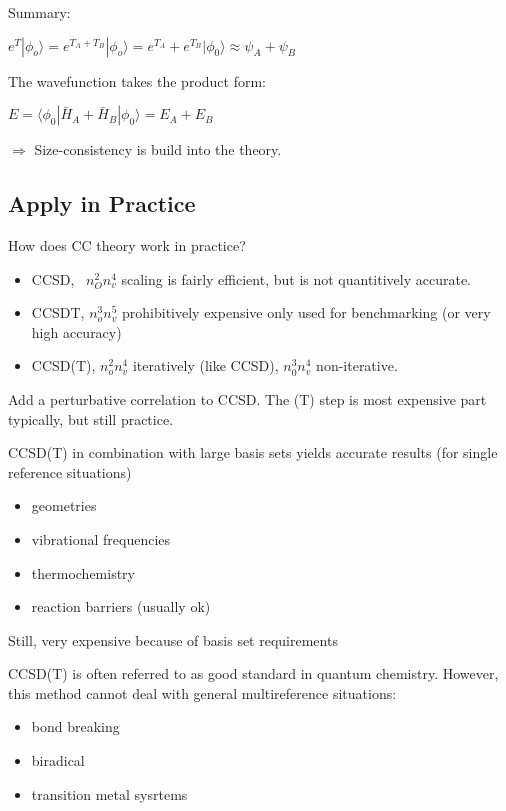 \documentclass[a4paper, 12pt]{article}
\begin{document}
\tab Summary:
\begin{center}
$e^T|\phi_o\rangle = e^{T_A+T_B}|\phi_o\rangle= e^{T_A} +e^{T_B}|\phi_0\rangle \approx \psi_A+\psi_B  $	
\end{center} 
The wavefunction takes the product form:
\begin{center}
$E=\langle \phi_0|\bar{H}_A+\bar{H}_B|\phi_0\rangle =E_A+E_B $	
\end{center} 
$\Rightarrow$ Size-consistency is build into the theory.\\

\subsection{Apply in Practice}
How does CC theory work in practice? 
\begin{itemize}
	\item CCSD, \ $n_O^2 n_v^4$ scaling is fairly efficient, but is not quantitively accurate.
	\item CCSDT, $n_o^3n_v^5$ prohibitively expensive only used for benchmarking (or very high accuracy)
	\item CCSD(T), $n_o^2n_v^4$ iteratively (like CCSD), $n_0^3n_v^4$ non-iterative.
\end{itemize}
\tab Add a perturbative correlation to CCSD. The (T) step is most expensive part typically, but still practice.

CCSD(T) in combination with large basis sets yields accurate results (for single reference situations)
\begin{itemize}
	\item geometries
	\item vibrational frequencies
	\item thermochemistry
	\item reaction barriers (usually ok)
\end{itemize}
\tab Still, very expensive because of basis set requirements

CCSD(T) is often referred to as good standard in quantum chemistry. However, this method cannot deal with general multireference situations:
\begin{itemize}
	\item bond breaking
	\item biradical
	\item transition metal sysrtems
\end{itemize}
\end{document}
